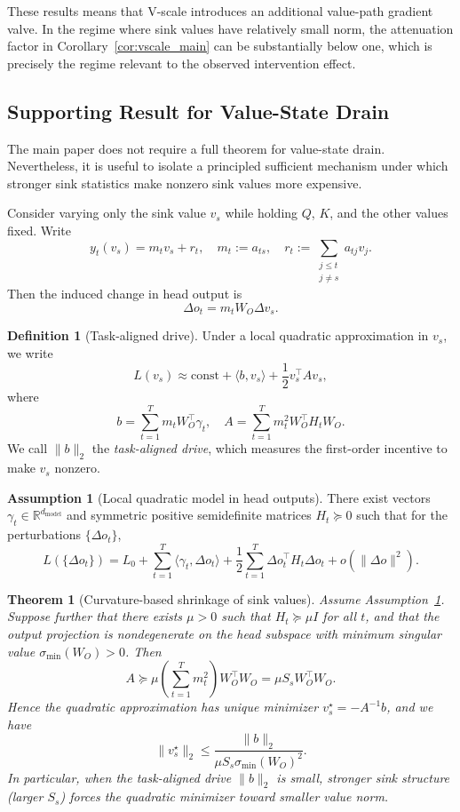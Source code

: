 \documentclass{article}
\theoremstyle{plain}
\newtheorem{theorem}{Theorem}
\theoremstyle{definition}
\newtheorem{definition}{Definition}
\newtheorem{assumption}{Assumption}
\theoremstyle{remark}
\begin{document}
These results means that V-scale introduces an additional value-path gradient valve. In the regime where sink values have relatively small norm, the attenuation factor in Corollary~\ref{cor:vscale_main} can be substantially below one, which is precisely the regime relevant to the observed intervention effect.

\subsection{Supporting Result for Value-State Drain}\label{app:theory:vsd}
The main paper does not require a full theorem for value-state drain. Nevertheless, it is useful to isolate a principled sufficient mechanism under which stronger sink statistics make nonzero sink values more expensive.

Consider varying only the sink value $v_s$ while holding $Q$, $K$, and the other values fixed. Write
\[
    y_t(v_s) = m_t v_s + r_t,
    \quad
    m_t := a_{ts},
    \quad
    r_t := \sum_{\substack{j\le t \\ j\neq s}} a_{tj}v_j.
\]
Then the induced change in head output is
\[
    \Delta o_t = m_t W_O \Delta v_s.
\]

\begin{definition}[Task-aligned drive]\label{def:task-drive-app}
Under a local quadratic approximation in $v_s$, we write
\[
    L(v_s) \approx \mathrm{const} + \langle b, v_s\rangle + \frac{1}{2}v_s^\top A v_s,
\]
where
\[
    b = \sum_{t=1}^T m_t W_O^\top \gamma_t,
    \quad
    A = \sum_{t=1}^T m_t^2 W_O^\top H_t W_O.
\]
We call $\|b\|_2$ the \emph{task-aligned drive}, which measures the first-order incentive to make $v_s$ nonzero.
\end{definition}

\begin{assumption}[Local quadratic model in head outputs]\label{assump:quadratic-app}
There exist vectors $\gamma_t \in \mathbb{R}^{d_{\mathrm{model}}}$ and symmetric positive semidefinite matrices $H_t \succeq 0$ such that for the perturbations $\{\Delta o_t\}$,
\[
    L(\{\Delta o_t\}) = L_0 + \sum_{t=1}^T \langle \gamma_t, \Delta o_t\rangle + \frac{1}{2}\sum_{t=1}^T \Delta o_t^\top H_t \Delta o_t + o(\|\Delta o\|^2).
\]
\end{assumption}

\begin{theorem}[Curvature-based shrinkage of sink values]\label{thm:as-to-vsd-app}
Assume Assumption~\ref{assump:quadratic-app}. Suppose further that there exists $\mu>0$ such that $H_t \succeq \mu I$ for all $t$, and that the output projection is nondegenerate on the head subspace with minimum singular value $\sigma_{\min}(W_O)>0$. Then
\[
    A \succeq \mu \left(\sum_{t=1}^T m_t^2\right) W_O^\top W_O = \mu S_s W_O^\top W_O.
\]
Hence the quadratic approximation has unique minimizer $v_s^\star = -A^{-1}b$, and we have
\[
    \|v_s^\star\|_2 \le \frac{\|b\|_2}{\mu S_s \sigma_{\min}(W_O)^2}.
\]
In particular, when the task-aligned drive $\|b\|_2$ is small, stronger sink structure (larger $S_s$) forces the quadratic minimizer toward smaller value norm.
\end{theorem}
\end{document}
